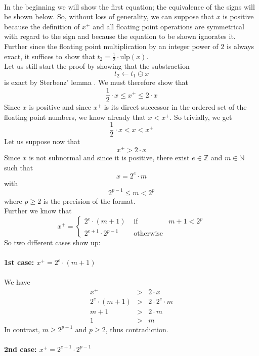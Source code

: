 \documentclass[a4paper,10pt,twoside]{article}
\newenvironment{proof}[1][Proof]{\begin{trivlist}
\item[\hskip \labelsep {\bfseries #1}]}{\end{trivlist}}
\newcommand{\N}{\ensuremath{\mathbb {N}}}
\newcommand{\Z}{\ensuremath{\mathbb {Z}}}
\newcommand{\mUlp}{\ensuremath{\mathrm{ulp}}}
\begin{document}
\begin{proof} ~ \\
In the beginning we will show the first equation; the equivalence of the signs will be shown below. 
So, without loss of generality, we can suppose that $x$ is positive because the definition of $x^+$ and all
floating point operations are symmetrical with regard to the sign \cite{IEEE754} 
and because the equation to be shown ignorates it. 
Further since the floating point multiplication by an integer power of $2$ is always exact, it suffices to show that 
$t_2 = \frac{1}{2} \cdot \mUlp \left( x \right)$.\\
Let us still start the proof by showing that the substraction
$$t_2 \gets t_1 \ominus x$$ 
is exact by Sterbenz' lemma \cite{Ste74}. We must therefore show that 
$$\frac{1}{2} \cdot x \leq x^+ \leq 2 \cdot x$$
Since $x$ is positive and since $x^+$ is its direct successor in the ordered set of the floating point numbers, we know
already that $x < x^+$.
So trivially, we get $$\frac{1}{2} \cdot x < x < x^+$$
Let us suppose now that 
$$x^+ > 2 \cdot x$$
Since $x$ is not subnormal and since it is positive, there exist $e \in \Z$ and $m \in \N$ such that
$$x = 2^e \cdot m$$
with
$$2^{p-1} \leq m < 2^p$$
where $p\geq 2$ is the precision of the format.\\
Further we know that 
$$x^+ = \left \lbrace \begin{array}{lll} 2^e \cdot \left(m + 1 \right) & \mbox{ if } & m+1 < 2^p \\
                                         2^{e+1} \cdot 2^{p-1} & \mbox{ otherwise} & \end{array} \right.$$
So two different cases show up: \\ ~ \\
{\bf 1st case: $x^+ = 2^e \cdot \left( m + 1 \right)$} \\ ~ \\
We have 
\begin{eqnarray*}
x^+ & > & 2 \cdot x \\
2^e \cdot \left( m + 1 \right) & > & 2 \cdot 2^e \cdot m \\
m+1 & > & 2 \cdot m \\
1 & > & m
\end{eqnarray*}
In contrast, $m \geq 2^{p-1}$ and $p \geq 2$, thus contradiction. \\ ~ \\
{\bf 2nd case: $x^+ = 2^{e+1} \cdot 2^{p-1}$} \\ ~ \\

\end{proof}
\end{document}
